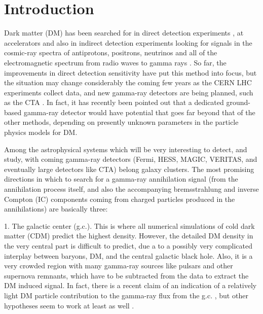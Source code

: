 \documentclass[10pt,aps,pra,reprint,amsmath,amsfonts,amssymb,showpacs,nofootinbib,floatfix]{revtex4-1}
\begin{document}
\maketitle
\section{Introduction}

Dark matter (DM) has been searched for in direct detection experiments
\cite{Pato:2010zk}, at accelerators
\cite{Ellis:2001hv,Baer:2006ff,Khachatryan:2011tk} and also in
indirect detection experiments looking for signals in the cosmic-ray
spectra of antiprotons, positrons, neutrinos and all of the
electromagnetic spectrum from radio waves to gamma rays
\cite{Bergstrom:2009ib}. So far, the improvements in direct detection
sensitivity have put this method into focus, but the situation may
change considerably the coming few years as the CERN LHC experiments
collect data, and new gamma-ray detectors are being planned, such as
the CTA \cite{Consortium:2010bc}. In fact, it has recently been
pointed out \cite{Bergstrom:2010gh} that a dedicated ground-based
gamma-ray detector would have potential that goes far beyond that of
the other methods, depending on presently unknown parameters in the
particle physics models for DM.


Among the astrophysical systems which will be very interesting to
detect, and study, with coming gamma-ray detectors (Fermi, HESS,
MAGIC, VERITAS, and eventually large detectors like CTA) belong galaxy
clusters. The most promising directions in which to search for a
gamma-ray annihilation signal (from the annihilation process itself,
and also the accompanying bremsstrahlung and inverse Compton (IC)
components coming from charged particles produced in the annihilations)
are basically three:

1. The galactic center (g.c.). This is where all numerical simulations
of cold dark matter (CDM) predict the highest density. However, the
detailed DM density in the very central part is difficult to predict,
due a to a possibly very complicated interplay between baryons, DM,
and the central galactic black hole. Also, it is a very crowded region
with many gamma-ray sources like pulsars and other supernova remnants,
which have to be subtracted from the data to extract the DM induced
signal. In fact, there is a recent claim of an indication of a
relatively light DM particle contribution to the gamma-ray flux from
the g.c. \cite{2010arXiv1010.2752H}, 
but other hypotheses seem to work
at least as well \cite{2010arXiv1012.5839B}.
\end{document}
